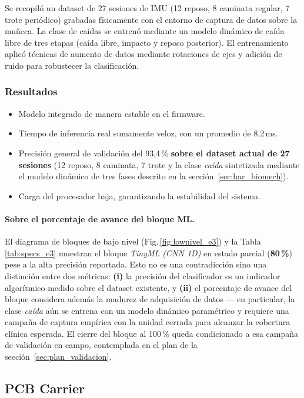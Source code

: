 \documentclass[letterpaper,11pt]{article}
\newcommand{\rfigura}[1]{Fig.\,\ref{#1}}
\newcommand{\rtabla}[1]{Tabla \ref{#1}}
\begin{document}
Se recopiló un dataset de 27 sesiones de IMU (12 reposo, 8 caminata regular, 7 trote periódico) grabadas físicamente con el entorno de captura de datos sobre la muñeca. La clase de caídas se entrenó mediante un modelo dinámico de caída libre de tres etapas (caída libre, impacto y reposo posterior). El entrenamiento aplicó técnicas de aumento de datos mediante rotaciones de ejes y adición de ruido para robustecer la clasificación.

\subsubsection{Resultados}

\begin{itemize}
    \item Modelo integrado de manera estable en el firmware.
    \item Tiempo de inferencia real sumamente veloz, con un promedio de 8,2\,ms.
    \item Precisión general de validación del 93,4\,\% \textbf{sobre el dataset actual de 27 sesiones} (12 reposo, 8 caminata, 7 trote y la clase \textit{caída} sintetizada mediante el modelo dinámico de tres fases descrito en la sección~\ref{sec:har_biomech}).
    \item Carga del procesador baja, garantizando la estabilidad del sistema.
\end{itemize}

\paragraph{Sobre el porcentaje de avance del bloque ML.} El diagrama de bloques de bajo nivel (\rfigura{fig:lownivel_e3}) y la \rtabla{tab:specs_e3} muestran el bloque \textit{TinyML (CNN 1D)} en estado parcial (\textbf{80\,\%}) pese a la alta precisión reportada. Esto no es una contradicción sino una distinción entre dos métricas: \textbf{(i)} la precisión del clasificador es un indicador algorítmico medido sobre el dataset existente, y \textbf{(ii)} el porcentaje de avance del bloque considera además la madurez de adquisición de datos --- en particular, la clase \textit{caída} aún se entrena con un modelo dinámico paramétrico y requiere una campaña de captura empírica con la unidad cerrada para alcanzar la cobertura clínica esperada. El cierre del bloque al 100\,\% queda condicionado a esa campaña de validación en campo, contemplada en el plan de la sección~\ref{sec:plan_validacion}.

\subsection{PCB Carrier}\label{sec:pcb_carrier}
\end{document}

